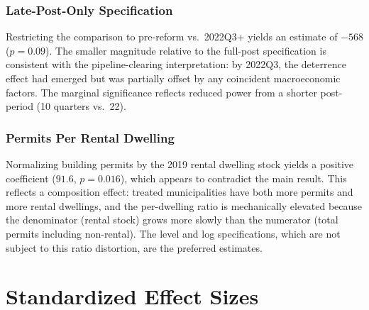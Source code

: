 \documentclass[12pt]{article}
\begin{document}
\subsubsection*{Late-Post-Only Specification} Restricting the comparison to pre-reform vs.\ 2022Q3+ yields an estimate of $-568$ ($p = 0.09$). The smaller magnitude relative to the full-post specification is consistent with the pipeline-clearing interpretation: by 2022Q3, the deterrence effect had emerged but was partially offset by any coincident macroeconomic factors. The marginal significance reflects reduced power from a shorter post-period (10 quarters vs.\ 22).

\subsubsection*{Permits Per Rental Dwelling} Normalizing building permits by the 2019 rental dwelling stock yields a positive coefficient ($91.6$, $p = 0.016$), which appears to contradict the main result. This reflects a composition effect: treated municipalities have both more permits and more rental dwellings, and the per-dwelling ratio is mechanically elevated because the denominator (rental stock) grows more slowly than the numerator (total permits including non-rental). The level and log specifications, which are not subject to this ratio distortion, are the preferred estimates.

\section{Standardized Effect Sizes}
\label{sec:sde}


\end{document}
